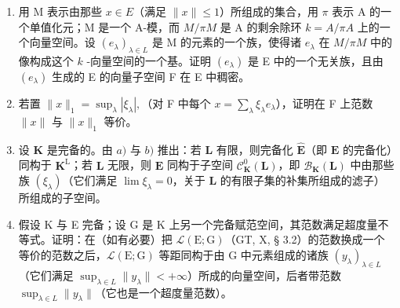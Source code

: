 \begin{enumerate}
\def\labelenumi{\alph{enumi})}
\item
  用 M 表示由那些 \(x \in E\)（满足 \(\| x \| \leqslant 1\)）所组成的集合，用 \(\pi\) 表示 A 的一个单值化元；M 是一个 A-模，而 \(M / \pi M\) 是 A 的剩余除环 \(k = A / \pi A\) 上的一个向量空间。设 \((e_{\lambda})_{\lambda \in L}\) 是 M 的元素的一个族，使得诸 \(e_{\lambda}\) 在 \(M / \pi M\) 中的像构成这个 \(k\) -向量空间的一个基。证明 \((e_{\lambda})\) 是 E 中的一个无关族，且由 \((e_{\lambda})\) 生成的 E 的向量子空间 F 在 E 中稠密。
\item
  若置 \(\| x\| _1 = \sup_{\lambda}|\xi_\lambda |,\)（对 F 中每个 \(x = \sum_{\lambda}\xi_{\lambda}e_{\lambda}\)），证明在 F 上范数 \(\| x\|\) 与 \(\| x\| _1\) 等价。
\item
  设 \(\mathbf{K}\) 是完备的。由 \(a)\) 与 \(b)\) 推出：若 \(\mathbf{L}\) 有限，则完备化 \(\hat{\mathbf{E}}\)（即 \(\mathbf{E}\) 的完备化）同构于 \(\mathbf{K}^{\mathrm{L}}\)；若 \(\mathbf{L}\) 无限，则 \(\hat{\mathbf{E}}\) 同构于子空间 \(\mathcal{C}_{\mathbf{K}}^{0}(\mathbf{L})\)，即 \(\mathcal{B}_{\mathbf{K}}(\mathbf{L})\) 中由那些族 \((\xi_{\lambda})\)（它们满足 \(\lim \xi_{\lambda} = 0\)，关于 \(\mathbf{L}\) 的有限子集的补集所组成的滤子）所组成的子空间。
\item
  假设 K 与 E 完备；设 G 是 K 上另一个完备赋范空间，其范数满足超度量不等式。证明：在（如有必要）把 \(\mathcal{L}(\mathrm{E};\mathrm{G})\)（GT, X, § 3.2）的范数换成一个等价的范数之后，\(\mathcal{L}(\mathrm{E};\mathrm{G})\) 等距同构于由 G 中元素组成的诸族 \((y_{\lambda})_{\lambda \in L}\)（它们满足 \(\sup_{\lambda \in L}\| y_{\lambda}\| < +\infty\)）所成的向量空间，后者带范数 \(\sup_{\lambda \in L}\| y_{\lambda}\|\)（它也是一个超度量范数）。
\end{enumerate}

